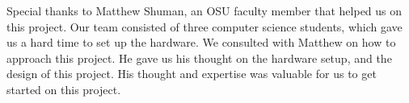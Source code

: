 Special thanks to Matthew Shuman, an OSU faculty member that helped us on this project. Our team consisted of three computer science students, which gave us a hard time to set up the hardware. We consulted with Matthew on how to approach this project. He gave us his thought on the hardware setup, and the design of this project. His thought and expertise was valuable for us to get started on this project. \\
